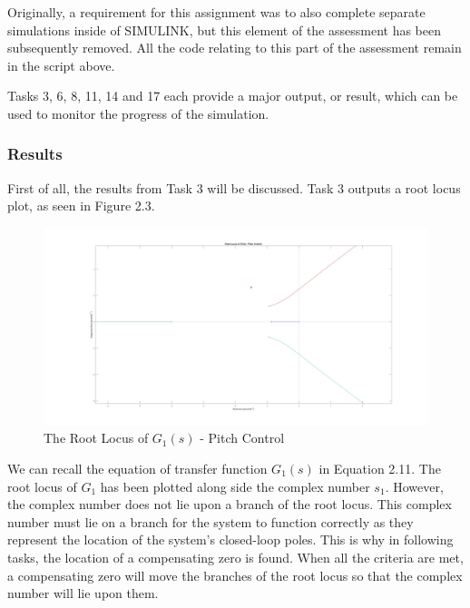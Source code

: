 \documentclass[stu, a4paper, 12pt, floatsintext]{apa7}
\numberwithin{figure}{section}
\numberwithin{table}{section}
\numberwithin{equation}{section}
\begin{document}
Originally, a requirement for this assignment was to also complete separate simulations inside of SIMULINK, but this element of the assessment has been subsequently removed. All the code relating to this part of the assessment remain in the script above. 

Tasks 3, 6, 8, 11, 14 and 17 each provide a major output, or result, which can be used to monitor the progress of the simulation.
\subsubsection{Results}
First of all, the results from Task 3 will be discussed. Task 3 outputs a root locus plot, as seen in Figure 2.3.
\begin{figure}[H]
    \caption{The Root Locus of $G_1(s)$ - Pitch Control}
    \label{fig:task3_result}
    \centering
    \includegraphics[width=1.0\textwidth]{pictures/Auotpilot/Task3.jpg}
\end{figure}

We can recall the equation of transfer function $G_1(s)$ in Equation 2.11. The root locus of $G_1$ has been plotted along side the complex number $s_1$. However, the complex number does not lie upon a branch of the root locus. This complex number must lie on a branch for the system to function correctly as they represent the location of the system's closed-loop poles. This is why in following tasks, the location of a compensating zero is found. When all the criteria are met, a compensating zero will move the branches of the root locus so that the complex number will lie upon them. 
\end{document}
